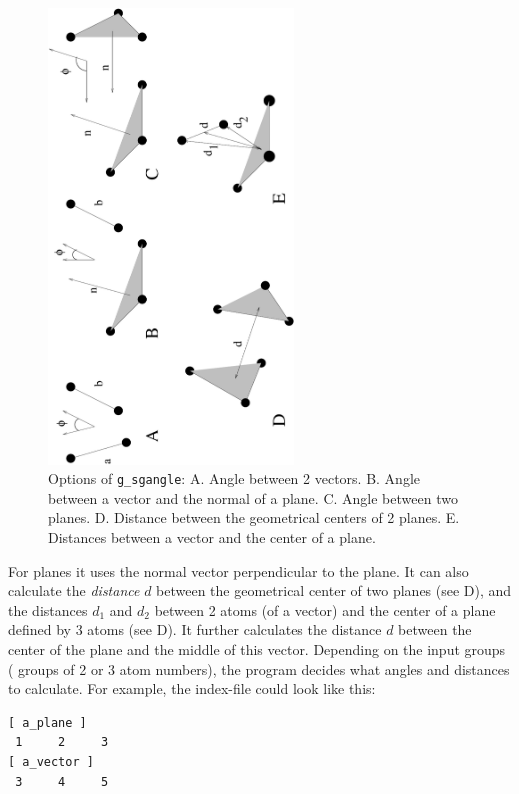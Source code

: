 \begin{figure}
\centerline{
{\includegraphics[width=6.5cm,angle=270]{plots/sgangle}}}
\caption[Options of {\tt g\_sgangle}.]{Options of {\tt g\_sgangle}: A. Angle between 2 vectors. B. Angle between a vector and the normal of a plane. C. Angle between two planes. D. Distance between the geometrical centers of 2 planes. E. Distances between a vector and the center of a plane.}
\label{fig:sgangle}
\end{figure}

For planes it uses the normal vector perpendicular to the plane.  It
can also calculate the {\em distance} $d$ between the geometrical
center of two planes (see D), and the distances
$d_1$ and $d_2$ between 2 atoms (of a vector) and the center of a
plane defined by 3 atoms (see D). It further
calculates the distance $d$ between the center of the plane and the
middle of this vector.  Depending on the input groups ({\ie} groups of
2 or 3 atom numbers), the program decides what angles and distances to
calculate. For example, the index-file could look like this:
{\samepage
\begin{verbatim}
[ a_plane ]
 1     2     3
[ a_vector ]
 3     4     5
\end{verbatim}}


